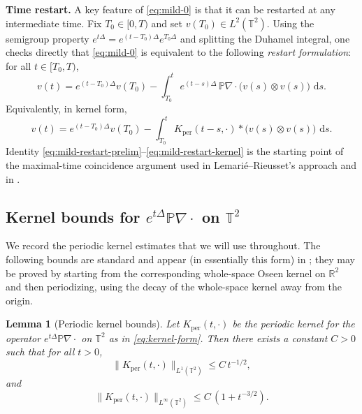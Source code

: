 \documentclass[12pt]{article}
\newcommand{\R}{\mathbb{R}}
\newcommand{\T}{\mathbb{T}}
\newcommand{\dd}{\,\mathrm{d}}
\newtheorem{lemma}[theorem]{Lemma}
\theoremstyle{remark}
\theoremstyle{remark}
\begin{document}
\medskip

\noindent\textbf{Time restart.}
A key feature of \eqref{eq:mild-0} is that it can be restarted at any intermediate time.
Fix $T_0\in[0,T)$ and set $v(T_0)\in L^2(\T^2)$.
Using the semigroup property $e^{t\Delta}=e^{(t-T_0)\Delta}e^{T_0\Delta}$ and splitting the Duhamel integral,
one checks directly that \eqref{eq:mild-0} is equivalent to the following \emph{restart formulation}:
for all $t\in[T_0,T)$,
\begin{equation}\label{eq:mild-restart-prelim}
v(t)=e^{(t-T_0)\Delta}v(T_0) - \int_{T_0}^t e^{(t-s)\Delta}\,\mathbb P\nabla\cdot\bigl(v(s)\otimes v(s)\bigr)\,\dd s.
\end{equation}
Equivalently, in kernel form,
\begin{equation}\label{eq:mild-restart-kernel}
v(t)=e^{(t-T_0)\Delta}v(T_0) - \int_{T_0}^t K_{\mathrm{per}}(t-s,\cdot) * \bigl(v(s)\otimes v(s)\bigr)\,\dd s.
\end{equation}
Identity \eqref{eq:mild-restart-prelim}--\eqref{eq:mild-restart-kernel} is the starting point of
the maximal-time coincidence argument used in Lemari\'e--Rieusset's approach and in \cite{LemarieRieusset2025HighlySingular}.

\subsection{Kernel bounds for $e^{t\Delta}\mathbb P\nabla\cdot$ on $\T^2$}\label{subsec:kernel}

We record the periodic kernel estimates that we will use throughout. The following bounds are
standard and appear (in essentially this form) in \cite{LemarieRieusset2025HighlySingular}; they may be proved by starting
from the corresponding whole-space Oseen kernel on $\R^2$ and then periodizing, using the decay of the
whole-space kernel away from the origin.

\begin{lemma}[Periodic kernel bounds]\label{lem:Kper-bounds}
Let $K_{\mathrm{per}}(t,\cdot)$ be the periodic kernel for the operator $e^{t\Delta}\mathbb P\nabla\cdot$
on $\T^2$ as in \eqref{eq:kernel-form}. Then there exists a constant $C>0$ such that for all $t>0$,
\begin{equation}\label{eq:Kper-L1}
\|K_{\mathrm{per}}(t,\cdot)\|_{L^1(\T^2)}\le C\,t^{-1/2},
\end{equation}
and
\begin{equation}\label{eq:Kper-Linfty}
\|K_{\mathrm{per}}(t,\cdot)\|_{L^\infty(\T^2)}\le C\,(1+t^{-3/2}).
\end{equation}
\end{lemma}
\end{document}
